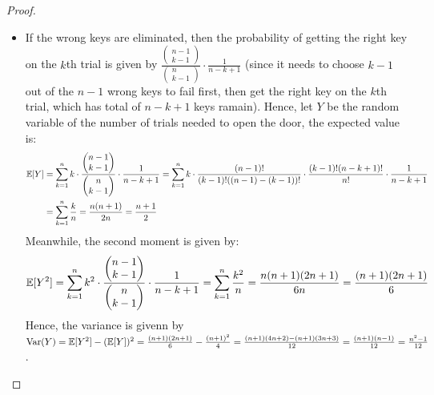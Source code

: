 \documentclass{article}
\begin{document}
\begin{proof}
\begin{itemize}
        \item[(b)] If the wrong keys are eliminated, then the probability of getting the right key on the $k$th trial is given by $\frac{\begin{pmatrix}n-1\\k-1\end{pmatrix}}{\begin{pmatrix}n\\k-1\end{pmatrix}}\cdot \frac{1}{n-k+1}$ (since it needs to choose $k-1$ out of the $n-1$ wrong keys to fail first, then get the right key on the $k$th trial, which has total of $n-k+1$ keys ramain). Hence, let $Y$ be the random variable of the number of trials needed to open the door, the expected value is:
        \begin{align}
            \mathbb{E}[Y]&=\sum_{k=1}^{n}k\cdot \frac{\begin{pmatrix}n-1\\k-1\end{pmatrix}}{\begin{pmatrix}n\\k-1\end{pmatrix}}\cdot \frac{1}{n-k+1} = \sum_{k=1}^{n}k\cdot \frac{(n-1)!}{(k-1)!((n-1)-(k-1))!}\cdot \frac{(k-1)!(n-k+1)!}{n!}\cdot \frac{1}{n-k+1}\\
            &=\sum_{k=1}^{n}\frac{k}{n} = \frac{n(n+1)}{2n} = \frac{n+1}{2}
        \end{align}
        Meanwhile, the second moment is given by:
        \begin{align}
            \mathbb{E}[Y^2]=\sum_{k=1}^{n}k^2\cdot \frac{\begin{pmatrix}n-1\\k-1\end{pmatrix}}{\begin{pmatrix}n\\k-1\end{pmatrix}}\cdot \frac{1}{n-k+1} = \sum_{k=1}^{n}\frac{k^2}{n} = \frac{n(n+1)(2n+1)}{6n} = \frac{(n+1)(2n+1)}{6}
        \end{align}
        Hence, the variance is givenn by $\textmd{Var}(Y)=\mathbb{E}[Y^2]-(\mathbb{E}[Y])^2 = \frac{(n+1)(2n+1)}{6}-\frac{(n+1)^2}{4} = \frac{(n+1)(4n+2)-(n+1)(3n+3)}{12} = \frac{(n+1)(n-1)}{12} = \frac{n^2-1}{12}$.
    \end{itemize}
\end{proof}

\newpage
\end{document}

